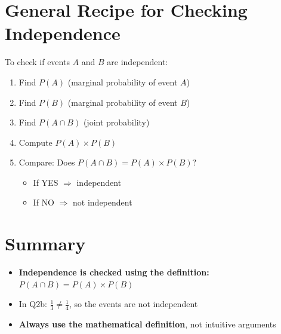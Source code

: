 \documentclass[11pt]{article}
\begin{document}
\section*{General Recipe for Checking Independence}

\begin{tcolorbox}[colback=green!10, colframe=green!50!black, title=Step-by-Step Process]
To check if events $A$ and $B$ are independent:

\begin{enumerate}
    \item Find $P(A)$ (marginal probability of event $A$)
    \item Find $P(B)$ (marginal probability of event $B$)
    \item Find $P(A \cap B)$ (joint probability)
    \item Compute $P(A) \times P(B)$
    \item Compare: Does $P(A \cap B) = P(A) \times P(B)$?
    \begin{itemize}
        \item If YES $\Rightarrow$ independent
        \item If NO $\Rightarrow$ not independent
    \end{itemize}
\end{enumerate}
\end{tcolorbox}

\section*{Summary}

\begin{itemize}
    \item \textbf{Independence is checked using the definition:} $P(A \cap B) = P(A) \times P(B)$

    \item In Q2b: $\frac{1}{3} \neq \frac{1}{4}$, so the events are not independent

    \item \textbf{Always use the mathematical definition}, not intuitive arguments
\end{itemize}
\end{document}
